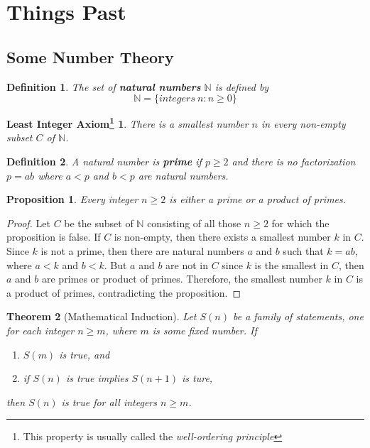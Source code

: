 \documentclass{article}
\newtheorem*{definition}{Definition}
\newtheorem{theorem}{Theorem}[section]
\newtheorem{proposition}[theorem]{Proposition}
\newtheorem*{least_integer_axiom}{Least Integer Axiom\footnote{This property is usually called the \textit{well-ordering principle}}}
\begin{document}
    \section{Things Past}
    \subsection{Some Number Theory}
    \begin{definition}
        The set of \textbf{natural numbers} \(\mathbb{N}\) is defined by \[\mathbb{N}=\{integers \  n: n \geq 0\}\]
    \end{definition}
    \begin{least_integer_axiom}
        There is a smallest number \(n\) in every non-empty subset \(C\) of \(\mathbb{N}\).
    \end{least_integer_axiom}
    \begin{definition}
        A natural number is \textbf{prime} if \(p \geq 2\) and there is no factorization
        \(p=ab\) where \(a < p\) and \(b < p\) are natural numbers.
    \end{definition}
    \begin{proposition}
        Every integer \(n \geq 2\) is either a prime or a product of primes.
    \end{proposition}
    \begin{proof}
        Let \(C\) be the subset of \(\mathbb{N}\) consisting of all those \(n \geq 2\)
        for which the proposition is false. If \(C\) is non-empty, then there exists a 
        smallest number \(k\) in \(C\). Since \(k\) is not a prime, then there are 
        natural numbers \(a\) and \(b\) such that \(k=ab\), where \(a < k\) and \(b < k\). 
        But \(a\) and \(b\) are not in \(C\) since \(k\) is the smallest in \(C\), 
        then \(a\) and \(b\) are primes or product of primes. Therefore, the smallest number \(k\) 
        in \(C\) is a product of primes, contradicting the proposition.
    \end{proof}
    \begin{theorem}[Mathematical Induction]
        Let \(S(n)\) be a family of statements, one for each integer \(n \geq m\), where 
        \(m\) is some fixed number. If 
        \begin{enumerate}[label=(\roman*)]
            \item \(S(m)\) is true, and
            \item if \(S(n)\) is true implies \(S(n+1)\) is ture, 
        \end{enumerate}
        then \(S(n)\) is true for all integers \(n \geq m\).
    \end{theorem}
\end{document}
